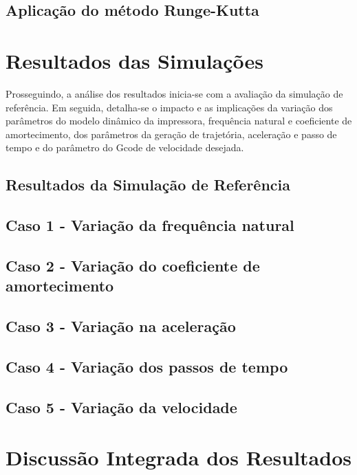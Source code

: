 \subsection{Aplicação do método Runge-Kutta}


\section{Resultados das Simulações}
Prosseguindo, a análise dos resultados inicia-se com a avaliação da simulação de referência. Em seguida, detalha-se o impacto e as implicações da variação dos parâmetros do modelo dinâmico da impressora, frequência natural e coeficiente de amortecimento, dos parâmetros da geração de trajetória, aceleração e passo de tempo e do parâmetro do Gcode de velocidade desejada.

\subsection{Resultados da Simulação de Referência}

\subsection{Caso 1 - Variação da frequência natural}

\subsection{Caso 2 - Variação do coeficiente de amortecimento}

\subsection{Caso 3 - Variação na aceleração}

\subsection{Caso 4 - Variação dos passos de tempo}

\subsection{Caso 5 - Variação da velocidade}

\section{Discussão Integrada dos Resultados}

